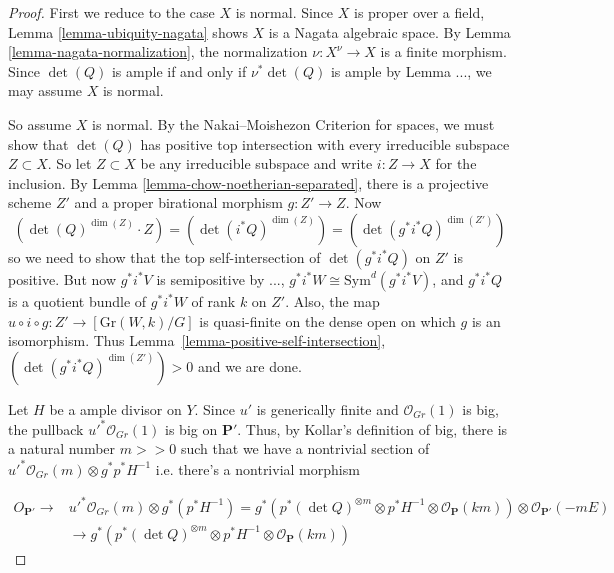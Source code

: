 \begin{proof}
First we reduce to the case $X$ is normal.
Since $X$ is proper over a field, Lemma \ref{lemma-ubiquity-nagata} shows $X$
is a Nagata algebraic space.
By Lemma \ref{lemma-nagata-normalization}, the normalization
$\nu : X^\nu \to X$ is a finite morphism.
Since $\det(Q)$ is ample if and only if $\nu^*\det(Q)$ is ample by
Lemma ..., we may
assume $X$ is normal.

So assume $X$ is normal.
By the Nakai--Moishezon Criterion for spaces,
we must show that $\det(Q)$ has positive top intersection with
every irreducible subspace $Z \subset X$.
So let $Z \subset X$ be any irreducible subspace and write $i : Z \to X$ for
the inclusion.
By Lemma \ref{lemma-chow-noetherian-separated}, there is a projective
scheme $Z'$ and a proper birational morphism $g : Z' \to Z$.
Now
$$
  (\det(Q)^{\dim(Z)} \cdot Z)
    = (\det(i^*Q)^{\dim(Z)})
    = (\det(g^*i^*Q)^{\dim(Z')})
$$
so we need to show that the top self-intersection of $\det(g^*i^*Q)$ on $Z'$
is positive.
But now $g^*i^*V$ is semipositive by ...,
$g^*i^*W \cong \mathrm{Sym}^d(g^*i^*V)$, and $g^*i^*Q$ is a
quotient bundle of $g^*i^*W$ of rank $k$ on $Z'$.
Also, the map $u \circ i \circ g : Z' \to [\mathrm{Gr}(W,k)/G]$ is quasi-finite
on the dense open on which $g$ is an isomorphism.
Thus Lemma~\ref{lemma-positive-self-intersection},
$(\det(g^*i^*Q)^{\dim(Z')}) > 0$ and we are done.
  
Let $H$ be a ample divisor on $Y$. Since $u'$ is generically finite and $\mathcal{O}_{Gr}(1)$ is big, the pullback $u'^*  \mathcal{O}_{Gr}(1)$ is big on $\mathbf{P}'$.  Thus, by Kollar's definition of big, there is a natural number $m>>0$ such that we have a nontrivial section of $u'^*\mathcal{O}_{Gr}(m)\otimes g^*p^*H^{-1}$ i.e. there's a nontrivial morphism 

\begin{align*}
{O}_{\mathbf{P}'}\to & u'^*\mathcal{O}_{Gr}(m)\otimes g^*(p^*H^{-1})=g^*(p^*(\det Q)^{\otimes m}\otimes p^*H^{-1}\otimes \mathcal{O}_{\mathbf{P}}(km))\otimes \mathcal{O}_{\mathbf{P}'}(-mE)\\&\to g^*(p^*(\det Q)^{\otimes m}\otimes p^*H^{-1}\otimes \mathcal{O}_{\mathbf{P}}(km))
\end{align*} 


\end{proof}
